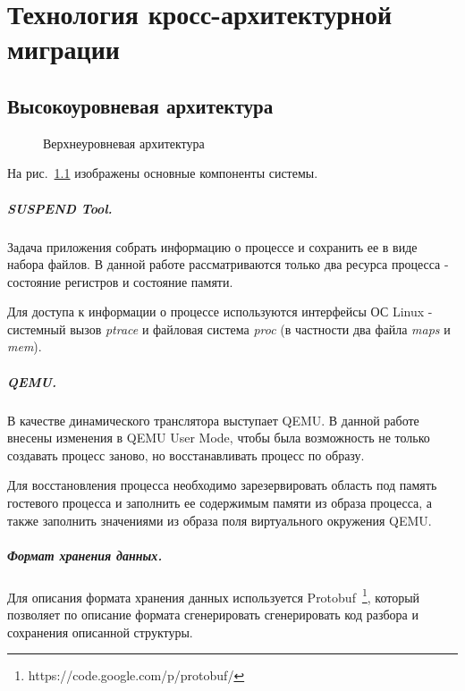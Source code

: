 \chapter{Технология кросс-архитектурной миграции}

\section{Высокоуровневая архитектура}

\begin{figure}[h]
\caption{Верхнеуровневая архитектура}
\label{pic:common_arch}
\end{figure}

На рис.~\ref{pic:common_arch} изображены основные компоненты системы.

\paragraph{SUSPEND Tool.}

Задача приложения собрать информацию о процессе и сохранить ее в виде набора файлов. В данной работе рассматриваются только два ресурса процесса - состояние регистров и состояние памяти.

Для доступа к информации о процессе используются интерфейсы ОС Linux - системный вызов \textit{ptrace} и файловая система \textit{proc} (в частности два файла \textit{maps} и \textit{mem}).

\paragraph{QEMU.}

В качестве динамического транслятора выступает QEMU. В данной работе внесены изменения в QEMU User Mode, чтобы была возможность не только создавать процесс заново, но восстанавливать процесс по образу.

Для восстановления процесса необходимо зарезервировать область под память гостевого процесса и заполнить ее содержимым памяти из образа процесса, а также заполнить значениями из образа поля виртуального окружения QEMU.

\paragraph{Формат хранения данных.}

Для описания формата хранения данных используется Protobuf~\footnote{https://code.google.com/p/protobuf/}, который позволяет по описание формата сгенерировать сгенерировать код разбора и сохранения описанной структуры.

